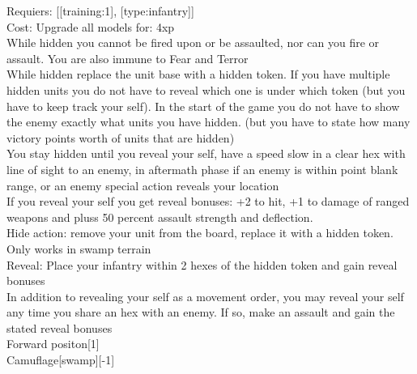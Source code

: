 Requiers: [[training:1], [type:infantry]] \\
Cost: Upgrade all models for: 4xp \\
While hidden you cannot be fired upon or be assaulted, nor can you fire or assault. You are also immune to Fear and Terror\\ 
While hidden replace the unit base with a hidden token. If you have multiple hidden units you do not have to reveal which one is under which token (but you have to keep track your self). In the start of the game you do not have to show the enemy exactly what units you have hidden. (but you have to state how many victory points worth of units that are hidden)\\ 
You stay hidden until you reveal your self, have a speed slow in a clear hex with line of sight to an enemy, in aftermath phase if an enemy is within point blank range, or an enemy special action reveals your location\\ 
If you reveal your self you get reveal bonuses: +2 to hit, +1 to damage of ranged weapons and pluss 50 percent assault strength and deflection.\\ 
Hide action: remove your unit from the board, replace it with a hidden token. Only works in swamp terrain\\ 
Reveal: Place your infantry within 2 hexes of the hidden token and gain reveal bonuses\\ 
In addition to revealing your self as a movement order, you may reveal your self any time you share an hex with an enemy. If so, make an assault and gain the stated reveal bonuses\\ 
Forward positon[1]\\ 
Camuflage[swamp][-1]\\ 







